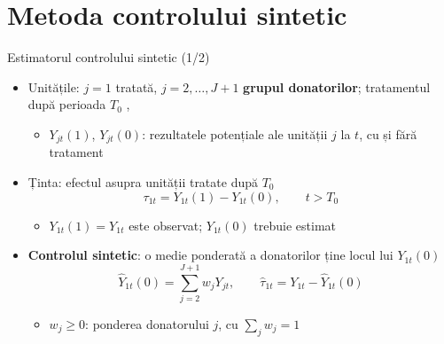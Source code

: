 \section{Metoda controlului sintetic}

\begin{frame}{Estimatorul controlului sintetic (1/2)}
\itemsize{\small}
\begin{itemize}
    \item Unitățile: $j = 1$ tratată, $j = 2, \dots, J + 1$ \textbf{grupul donatorilor}; tratamentul după perioada $T_0$ , 
    \begin{itemize}
        \item $Y_{jt}(1)$, $Y_{jt}(0)$: rezultatele potențiale ale unității $j$ la $t$, cu și fără tratament
    \end{itemize}
    \item Ținta: efectul asupra unității tratate după $T_0$ \[ \tau_{1t} = Y_{1t}(1) - Y_{1t}(0), \qquad t > T_0 \]
    \begin{itemize}
        \item $Y_{1t}(1) = Y_{1t}$ este observat; $Y_{1t}(0)$ trebuie estimat
    \end{itemize}
    \item \textbf{Controlul sintetic}: o medie ponderată a donatorilor ține locul lui $Y_{1t}(0)$ \[ \hat Y_{1t}(0) = \sum_{j=2}^{J+1} w_jY_{jt}, \qquad \hat\tau_{1t} = Y_{1t} - \hat Y_{1t}(0) \]
    \begin{itemize}
        \item $w_j \ge 0$: ponderea donatorului $j$, cu $\sum_j w_j = 1$
    \end{itemize}
\end{itemize}
\end{frame}

